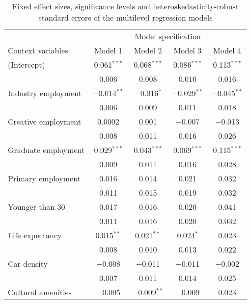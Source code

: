 \begin{table}

\caption[Fixed effects of the multilevel regression models]{Fixed effect sizes, significance levels and heteroskedasticity-robust standard errors of the multilevel regression models}
\label{tab:multilevel}
\centering
\small
\begin{tabular}[t]{lcccc}
\toprule
\multicolumn{1}{c}{ } & \multicolumn{4}{c}{Model specification} \\
\cmidrule(l{3pt}r{3pt}){2-5}
Context variables & Model 1 & Model 2 & Model 3 & Model 4\\
\midrule
(Intercept) & \num{0.061}$^{***}$ & \num{0.068}$^{***}$ & \num{0.086}$^{***}$ & \num{0.113}$^{***}$\\
 & \num{0.006} & \num{0.008} & \num{0.010} & \num{0.016}\\
Industry employment & \num{-0.014}$^{**}$ & \num{-0.016}$^{*}$ & \num{-0.029}$^{**}$ & \num{-0.045}$^{**}$\\
 & \num{0.006} & \num{0.009} & \num{0.011} & \num{0.018}\\
Creative employment & \num{0.0002} & \num{0.001} & \num{-0.007} & \num{-0.013}\\
 & \num{0.008} & \num{0.011} & \num{0.016} & \num{0.026}\\
Graduate employment & \num{0.029}$^{***}$ & \num{0.043}$^{***}$ & \num{0.069}$^{***}$ & \num{0.115}$^{***}$\\
 & \num{0.009} & \num{0.011} & \num{0.016} & \num{0.028}\\
Primary employment & \num{0.016} & \num{0.014} & \num{0.021} & \num{0.032}\\
 & \num{0.011} & \num{0.015} & \num{0.019} & \num{0.032}\\
Younger than 30 & \num{0.017} & \num{0.016} & \num{0.020} & \num{0.041}\\
 & \num{0.011} & \num{0.016} & \num{0.020} & \num{0.032}\\
Life expectancy & \num{0.015}$^{**}$ & \num{0.021}$^{**}$ & \num{0.024}$^{*}$ & \num{0.023}\\
 & \num{0.008} & \num{0.010} & \num{0.013} & \vphantom{1} \num{0.022}\\
Car density & \num{-0.008} & \num{-0.011} & \num{-0.011} & \num{-0.002}\\
 & \num{0.007} & \num{0.011} & \num{0.014} & \num{0.025}\\
Cultural amenities & \num{-0.005} & \num{-0.009}$^{**}$ & \num{-0.009} & \num{0.023}\\

\end{tabular}
\end{table}
